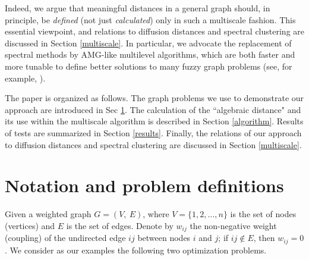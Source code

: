 \documentclass[final]{siamltex}
\begin{document}
Indeed, we argue that meaningful distances in a general graph
should, in principle, be {\it defined} (not just {\it calculated})
only in such a multiscale fashion. This essential viewpoint, and
relations to diffusion distances and spectral clustering are
discussed in Section \ref{multiscale}. In particular, we
advocate the replacement of spectral methods by AMG-like
multilevel algorithms, which are both faster and more tunable to
define better solutions to many fuzzy graph problems
(see, for example, \cite{safro2004,safro2005}).

The paper is organized as follows. The graph problems we use to
demonstrate our approach are introduced in Sec \ref{prob-def}. The
calculation of the ``algebraic distance" and its use within the
multiscale algorithm is described in Section \ref{algorithm}. Results of tests
are summarized in Section \ref{results}. Finally, the
relations of our approach to diffusion distances and spectral
clustering are discussed in Section \ref{multiscale}.





\section{Notation and problem definitions}\label{prob-def}
\par Given a weighted graph $G=(V,~E)$, where $V=\{1,2,...,n\}$
is the set of nodes (vertices) and $E$ is the set of edges.
Denote by $w_{ij}$ the non-negative weight (coupling)
of the undirected edge $ij$ between nodes $i$ and $j$; if
$ij\notin E$, then $w_{ij}=0$. We consider as our examples the following two optimization problems.
\end{document}
